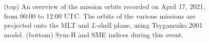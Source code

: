 \documentclass[
  letterpaper,
  DIV=11,
  numbers=noendperiod]{scrartcl}
\begin{document}
\begin{figure}


\caption{\label{fig-1}(top) An overview of the mission orbits recorded on April 17, 2021, from 00:00 to 12:00 UTC. The orbits of the various missions are projected onto the MLT and \(L\)-shell plane, using Tsyganenko 2001 model. (bottom) Sym-H and SME indices during this event.}

\end{figure}%





\end{document}
